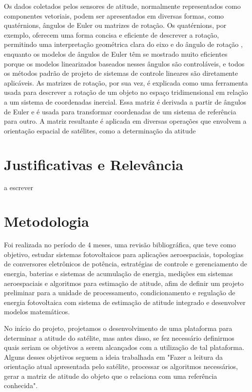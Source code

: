 \documentclass[
	12pt,				%
	openright,			%
	oneside,			%
	a4paper,			%
	english,			%
	brazil				%
	]{abntex2}
\begin{document}
Os dados coletados pelos sensores de atitude, normalmente representados como componentes vetoriais, podem ser apresentados em diversas formas, como quatérnions, ângulos de Euler ou matrizes de rotação. Os quatérnions, por exemplo, oferecem uma forma concisa e eficiente de descrever a rotação, permitindo uma interpretação geométrica clara do eixo e do ângulo de rotação \cite{jia2013quaternions}, enquanto os modelos de ângulos de Euler têm se mostrado muito eficientes porque os modelos linearizados baseados nesses ângulos são controláveis, e todos os métodos padrão de projeto de sistemas de controle lineares são diretamente aplicáveis\cite{YANG2012198}. As matrizes de rotação, por sua vez, é explicada como uma ferramenta usada para descrever a rotação de um objeto no espaço tridimensional em relação a um sistema de coordenadas inercial. Essa matriz é derivada a partir de ângulos de Euler e é usada para transformar coordenadas de um sistema de referência para outro. A matriz resultante é aplicada em diversas operações que envolvem a orientação espacial de satélites, como a determinação da atitude \cite{silva2016}


  

\section{Justificativas e Relevância}

a escrever

\section{Metodologia}
Foi realizada no período de 4 meses, uma revisão bibliográfica, que teve como objetivo, estudar sistemas fotovoltaicos para aplicações aeroespaciais, topologias de conversores eletrônicos de potência, estratégias de controle e gerenciamento de energia, baterias e sistemas de acumulação de energia, medições em sistemas aeroespaciais e algoritmos para estimação de atitude, afim de definir um projeto preliminar para a unidade de processamento, condicionamento e regulação de energia fotovoltaica com sistema de estimação de atitude integrado e desenvolver modelos matemáticos. 

No início do projeto, projetamos o desenvolvimento de uma plataforma para determinar a atitude do satélite, mas antes disso, se fez necessário definirmos quais seriam os objetivos a serem alcançados com a utilização de tal plataforma. Alguns desses objetivos seguem a ideia trabalhada em \cite{tavares2017}"Fazer a leitura da orientação atual apresentada pelo satélite, processar os algoritmos necessários, gerar a matriz de atitude do objeto que o relaciona com uma referência conhecida".
\end{document}
